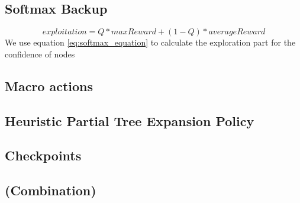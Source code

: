 \documentclass[10pt,a4paper]{article}
\begin{document}
\subsection{Softmax Backup}
\begin{equation}\label{eq:softmax_equation}
exploitation = Q * maxReward + (1 - Q ) * averageReward
\end{equation}
We use equation \ref{eq:softmax_equation} to calculate the exploration part for the confidence of nodes
\subsection{Macro actions}
\cite{salesman}
\subsection{Heuristic Partial Tree Expansion Policy}
\subsection{Checkpoints}
\subsection{(Combination)}
\clearpage
\end{document}
